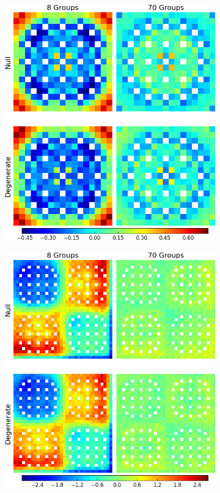 \begin{figure}[h!]
\centering
\begin{subfigure}{0.35\textwidth}
  \includegraphics[width=\linewidth]{figures/assembly/fission-errors}
  \caption{}
  \label{fig:assm-fiss-error}
\end{subfigure}
\begin{subfigure}{0.35\textwidth}
  \centering
  \includegraphics[width=\linewidth]{figures/reflector/fission-errors}

\end{subfigure}
\end{figure}
